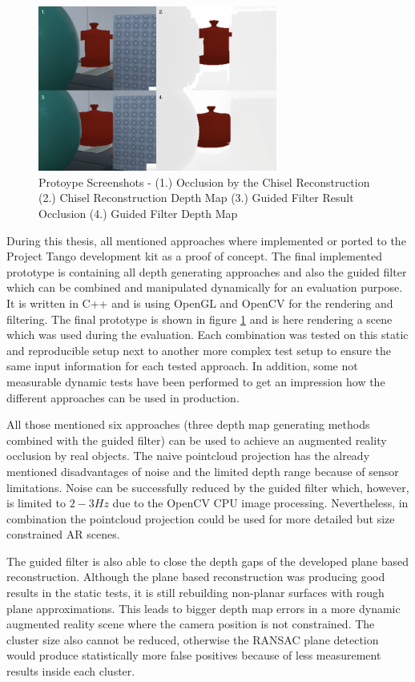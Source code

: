 \documentclass[12pt]{support/thcolognereport}
\begin{document}
\begin{figure}[h]
  \centering
	\includegraphics[width=0.7\textwidth]{content/images/report-demo.png} 
  \caption{Protoype Screenshots - (1.) Occlusion by the Chisel Reconstruction (2.) Chisel Reconstruction Depth Map (3.) Guided Filter Result Occlusion (4.) Guided Filter Depth Map}
  \label{fig:filter-demo}
\end{figure}

During this thesis, all mentioned approaches where implemented or ported to the Project Tango development kit as a proof of concept. The final implemented prototype is containing all depth generating approaches and also the guided filter which can be combined and manipulated dynamically for an evaluation purpose. It is written in C++ and is using OpenGL and OpenCV for the rendering and filtering. The final prototype is shown in figure \ref{fig:filter-demo} and is here rendering a scene which was used during the evaluation. Each combination was tested on this static and reproducible setup next to another more complex test setup to ensure the same input information for each tested approach. In addition, some not measurable dynamic tests have been performed to get an impression how the different approaches can be used in production.

All those mentioned six approaches (three depth map generating methods combined with the guided filter) can be used to achieve an augmented reality occlusion by real objects. The naive pointcloud projection has the already mentioned disadvantages of noise and the limited depth range because of sensor limitations. Noise can be successfully reduced by the guided filter which, however, is limited to \(2-3Hz\) due to the OpenCV CPU image processing. Nevertheless, in combination the pointcloud projection could be used for more detailed but size constrained AR scenes. 

The guided filter is also able to close the depth gaps of the developed plane based reconstruction. Although the plane based reconstruction was producing good results in the static tests, it is still rebuilding non-planar surfaces with rough plane approximations. This leads to bigger depth map errors in a more dynamic augmented reality scene where the camera position is not constrained. The cluster size also cannot be reduced, otherwise the RANSAC plane detection would produce statistically more false positives because of less measurement results inside each cluster. 
\end{document}
